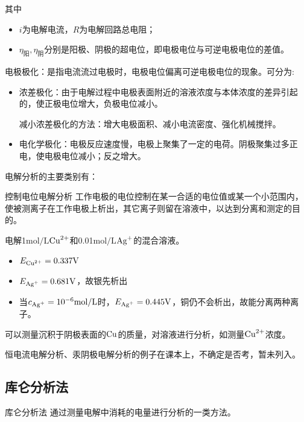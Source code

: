 其中
\begin{itemize}
	\item $i$为电解电流，$R$为电解回路总电阻；
	\item $\eta_{\text{阳}},\eta_{\text{阴}}$分别是阳极、阴极的超电位，即电极电位与可逆电极电位的差值。
\end{itemize}

\begin{note}
	电极极化：是指电流流过电极时，电极电位偏离可逆电极电位的现象。可分为:
	\begin{itemize}
		\item 浓差极化：由于电解过程中电极表面附近的溶液浓度与本体浓度的差异引起的，使正极电位增大，负极电位减小。
		
		减小浓差极化的方法：增大电极面积、减小电流密度、强化机械搅拌。
		\item 电化学极化：电极反应速度慢，电极上聚集了一定的电荷。阴极聚集过多正电，使电极电位减小；反之增大。
	\end{itemize}
\end{note}


电解分析的主要类别有：
\begin{definition*}{控制电位电解分析}{}
	工作电极的电位控制在某一合适的电位值或某一个小范围内，使被测离子在工作电极上析出，其它离子则留在溶液中，以达到{\heiti 分离和测定}的目的。
\end{definition*}

\begin{example}
	电解1$\mathrm{mol/L}$$\ce{Cu^2+}$和0.01$\mathrm{mol/L}$$\ce{Ag+}$的混合溶液。
	
	\begin{itemize}
		\item $E_{\ce{Cu^2+}}=0.337\mathrm{V}$
		\item $E_{\ce{Ag+}}=0.681\mathrm{V}$，故银先析出
		\item 当$c_{\ce{Ag+}}=10^{-6}\mathrm{mol/L}$时，$E_{\ce{Ag+}}=0.445\mathrm{V}$，铜仍不会析出，故能分离两种离子。
	\end{itemize}
	
	可以测量沉积于阴极表面的$\ce{Cu}$的质量，对溶液进行分析，如测量$\ce{Cu^2+}$浓度。
\end{example}

恒电流电解分析、汞阴极电解分析的例子在课本上，不确定是否考，暂未列入。

\subsection{库仑分析法}
\begin{definition*}{库仑分析法}{}
	通过测量电解中消耗的电量进行分析的一类方法。
\end{definition*}
	
